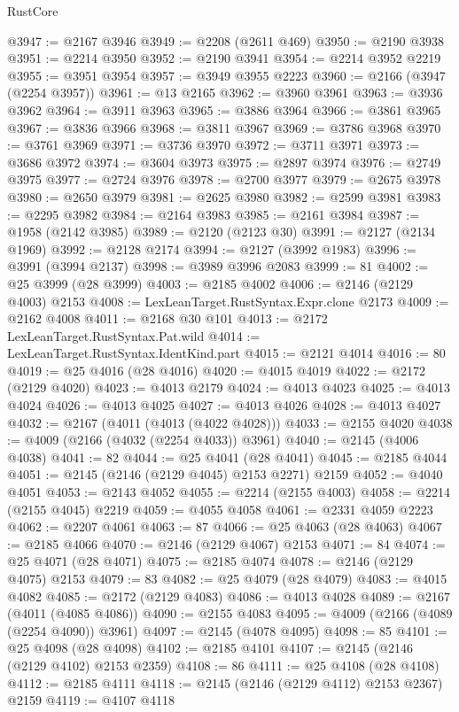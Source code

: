 \begin{lexlean}{RustCore}
\begin{coremodule}
@3947 := @2167 @3946
@3949 := @2208 (@2611 @469)
@3950 := @2190 @3938
@3951 := @2214 @3950
@3952 := @2190 @3941
@3954 := @2214 @3952 @2219
@3955 := @3951 @3954
@3957 := @3949 @3955 @2223
@3960 := @2166 (@3947 (@2254 @3957))
@3961 := @13 @2165
@3962 := @3960 @3961
@3963 := @3936 @3962
@3964 := @3911 @3963
@3965 := @3886 @3964
@3966 := @3861 @3965
@3967 := @3836 @3966
@3968 := @3811 @3967
@3969 := @3786 @3968
@3970 := @3761 @3969
@3971 := @3736 @3970
@3972 := @3711 @3971
@3973 := @3686 @3972
@3974 := @3604 @3973
@3975 := @2897 @3974
@3976 := @2749 @3975
@3977 := @2724 @3976
@3978 := @2700 @3977
@3979 := @2675 @3978
@3980 := @2650 @3979
@3981 := @2625 @3980
@3982 := @2599 @3981
@3983 := @2295 @3982
@3984 := @2164 @3983
@3985 := @2161 @3984
@3987 := @1958 (@2142 @3985)
@3989 := @2120 (@2123 @30)
@3991 := @2127 (@2134 @1969)
@3992 := @2128 @2174
@3994 := @2127 (@3992 @1983)
@3996 := @3991 (@3994 @2137)
@3998 := @3989 @3996 @2083
@3999 := 81
@4002 := @25 @3999 (@28 @3999)
@4003 := @2185 @4002
@4006 := @2146 (@2129 @4003) @2153
@4008 := LexLeanTarget.RustSyntax.Expr.clone @2173
@4009 := @2162 @4008
@4011 := @2168 @30 @101
@4013 := @2172 LexLeanTarget.RustSyntax.Pat.wild
@4014 := LexLeanTarget.RustSyntax.IdentKind.part
@4015 := @2121 @4014
@4016 := 80
@4019 := @25 @4016 (@28 @4016)
@4020 := @4015 @4019
@4022 := @2172 (@2129 @4020)
@4023 := @4013 @2179
@4024 := @4013 @4023
@4025 := @4013 @4024
@4026 := @4013 @4025
@4027 := @4013 @4026
@4028 := @4013 @4027
@4032 := @2167 (@4011 (@4013 (@4022 @4028)))
@4033 := @2155 @4020
@4038 := @4009 (@2166 (@4032 (@2254 @4033)) @3961)
@4040 := @2145 (@4006 @4038)
@4041 := 82
@4044 := @25 @4041 (@28 @4041)
@4045 := @2185 @4044
@4051 := @2145 (@2146 (@2129 @4045) @2153 @2271) @2159
@4052 := @4040 @4051
@4053 := @2143 @4052
@4055 := @2214 (@2155 @4003)
@4058 := @2214 (@2155 @4045) @2219
@4059 := @4055 @4058
@4061 := @2331 @4059 @2223
@4062 := @2207 @4061
@4063 := 87
@4066 := @25 @4063 (@28 @4063)
@4067 := @2185 @4066
@4070 := @2146 (@2129 @4067) @2153
@4071 := 84
@4074 := @25 @4071 (@28 @4071)
@4075 := @2185 @4074
@4078 := @2146 (@2129 @4075) @2153
@4079 := 83
@4082 := @25 @4079 (@28 @4079)
@4083 := @4015 @4082
@4085 := @2172 (@2129 @4083)
@4086 := @4013 @4028
@4089 := @2167 (@4011 (@4085 @4086))
@4090 := @2155 @4083
@4095 := @4009 (@2166 (@4089 (@2254 @4090)) @3961)
@4097 := @2145 (@4078 @4095)
@4098 := 85
@4101 := @25 @4098 (@28 @4098)
@4102 := @2185 @4101
@4107 := @2145 (@2146 (@2129 @4102) @2153 @2359)
@4108 := 86
@4111 := @25 @4108 (@28 @4108)
@4112 := @2185 @4111
@4118 := @2145 (@2146 (@2129 @4112) @2153 @2367) @2159
@4119 := @4107 @4118

\end{coremodule}
\end{lexlean}
